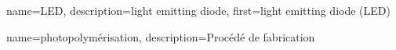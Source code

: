
{
  name={LED},
  description={light emitting diode},
  first={light emitting diode (LED)}
}

{
  name={photopolymérisation},
  description={Procédé de fabrication}
}


